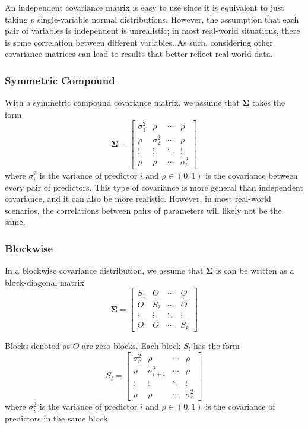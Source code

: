 \documentclass{article}
\begin{document}
An independent covariance matrix is easy to use since it is equivalent to just taking $p$ single-variable normal distributions. However, the assumption that each pair of variables is independent is unrealistic; in most real-world situations, there is some correlation between different variables. As such, considering other covariance matrices can lead to results that better reflect real-world data.

\subsubsection{Symmetric Compound}
With a symmetric compound covariance matrix, we assume that $\mathbf{\Sigma}$ takes the form
\begin{equation}
	\mathbf{\Sigma} = \begin{bmatrix}
		\sigma_1^2 & \rho & \cdots & \rho\\
		\rho & \sigma_2^2 & \cdots & \rho\\
		\vdots & \vdots & \ddots & \vdots\\
		\rho & \rho & \cdots & \sigma_p^2
	\end{bmatrix}
\end{equation}
where $\sigma_i^2$ is the variance of predictor $i$ and $\rho \in (0, 1)$ is the covariance between every pair of predictors. This type of covariance is more general than independent covariance, and it can also be more realistic. However, in most real-world scenarios, the correlations between pairs of parameters will likely not be the same.

\subsubsection{Blockwise}
In a blockwise covariance distribution, we assume that $\mathbf{\Sigma}$ is can be written as a block-diagonal matrix
\begin{equation}
	\mathbf{\Sigma} = \begin{bmatrix}
		S_1 & O & \cdots & O\\
		O & S_2 & \cdots & O\\
		\vdots & \vdots & \ddots & \vdots\\
		O & O & \cdots & S_k
	\end{bmatrix}
\end{equation}

Blocks denoted as $O$ are zero blocks. Each block $S_l$ has the form
\begin{equation}
	S_l = \begin{bmatrix}
		\sigma_{r}^2 & \rho & \cdots & \rho\\
		\rho & \sigma_{r + 1}^2 & \cdots & \rho\\
		\vdots & \vdots & \ddots & \vdots\\
		\rho & \rho & \cdots & \sigma_{s}^2
	\end{bmatrix}	
\end{equation}
where $\sigma_i^2$ is the variance of predictor $i$ and $\rho\in (0, 1)$ is the covariance of predictors in the same block.
\end{document}
